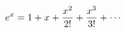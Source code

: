 \documentclass[preview]{standalone}
\begin{document}
\begin{align*}
\special{dvisvgm:raw <g id='unique000'>}e^x=1+x+\frac{x^2}{2!}+\frac{x^3}{3!}+\cdots\special{dvisvgm:raw </g>}
\end{align*}
\end{document}
